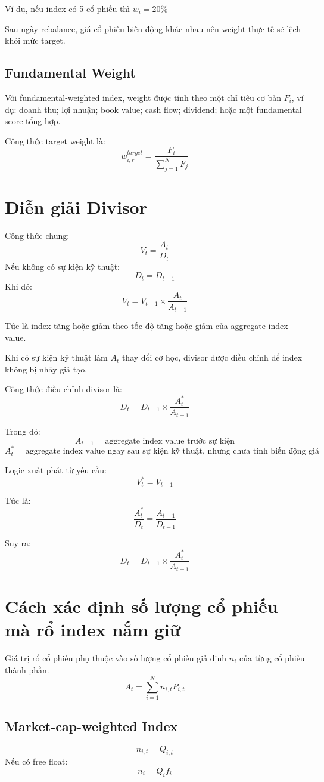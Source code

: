Ví dụ, nếu index có 5 cổ phiếu thì $w_i = 20\%$

Sau ngày rebalance, giá cổ phiếu biến động khác nhau nên weight thực tế sẽ lệch khỏi mức target.

\subsection{Fundamental Weight}
Với fundamental-weighted index, weight được tính theo một chỉ tiêu cơ bản \(F_i\), ví dụ:
 doanh thu;
 lợi nhuận;
 book value;
 cash flow;
 dividend;
 hoặc một fundamental score tổng hợp.

Công thức target weight là:
\[
w_{i,r}^{target}
=
\frac{F_i}{\sum_{j=1}^{N}F_j}
\]

\section{Diễn giải Divisor}
\label{sec:app_index_divisor}
Công thức chung:
\[
V_t = \frac{A_t}{D_t}
\]
Nếu không có sự kiện kỹ thuật:
\[
D_t = D_{t-1}
\]
Khi đó:
\[
V_t
=
V_{t-1}
\times
\frac{A_t}{A_{t-1}}
\]

Tức là index tăng hoặc giảm theo tốc độ tăng hoặc giảm của aggregate index value.

Khi có sự kiện kỹ thuật làm \(A_t\) thay đổi cơ học, divisor được điều chỉnh để index không bị nhảy giả tạo.

Công thức điều chỉnh divisor là:
\[
D_t
=
D_{t-1}
\times
\frac{A_t^*}{A_{t-1}}
\]

Trong đó:
\[
A_{t-1}
=
\text{aggregate index value trước sự kiện}
\]
\[
A_t^*
=
\text{aggregate index value ngay sau sự kiện kỹ thuật, nhưng chưa tính biến động giá thị trường thật}
\]

Logic xuất phát từ yêu cầu:
\[
V_t^* = V_{t-1}
\]

Tức là:
\[
\frac{A_t^*}{D_t}
=
\frac{A_{t-1}}{D_{t-1}}
\]

Suy ra:
\[
D_t
=
D_{t-1}
\times
\frac{A_t^*}{A_{t-1}}
\]

\section{Cách xác định số lượng cổ phiếu mà rổ index nắm giữ}
\label{sec:app_index_constituent_shares}
Giá trị rổ cổ phiếu phụ thuộc vào số lượng cổ phiếu giả định \(n_i\) của từng cổ phiếu thành phần.
\[
A_t
=
\sum_{i=1}^{N} n_{i,t}P_{i,t}
\]

\subsection{Market-cap-weighted Index}
\[
n_{i,t}=Q_{i,t}
\]
Nếu có free float:
\[
n_i=Q_if_i
\]

